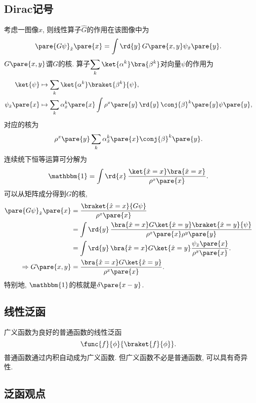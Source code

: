 \documentclass[hidelinks]{ctexart}
\begin{document}

\subsection{Dirac记号} %
\label{sub:dirac记号}

\newpoint{}考虑一图像$\hat x$, 则线性算子$\hat G$的作用在该图像中为
\[ \pare{G\psi}_{\hat x}\pare{x} = \int \rd{y}\,G\pare{x,y}\psi_{\hat x}\pare{y}. \]
\newpoint{}$G\pare{x,y}$谓$G$的核.
\newpoint{}算子$\displaystyle \sum_k \ket{\alpha^k}\bra{\beta^k}$对向量$\psi$的作用为
\begin{align*}
    \ket{\psi} &\mapsto \sum_k \ket{\alpha^k}\braket{\beta^k}{\psi}, \\
    \psi_{\hat x}\pare{x} &\mapsto \sum_k \alpha_{\hat x}^k\pare{x} \int \rho^{x}\pare{y}\,\rd{y}\, \conj{\beta}^k\pare{y}\psi\pare{y},
\end{align*}
对应的核为
\[ \rho^x\pare{y}\sum_k \alpha_{\hat x}^k\pare{x} \conj{\beta}^k\pare{y}. \]
\newpoint{}连续统下恒等运算可分解为
\[ \mathbbm{1} = \int \rd{x}\, \frac{\ket{\hat x = x}\bra{\hat x = x}}{\rho^{x}\pare{x}}. \]
\newpoint{}可以从矩阵成分得到$G$的核,
\begin{align*}
    \pare{G\psi}_{\hat x}\pare{x} &= \frac{\braket{\hat x=x}{G\psi}}{\rho^{x}\pare{x}} \\
    &= \int \rd{y}\, \frac{\bra{\hat x=x}G\ket{\hat x=y}\braket{\hat x=y}{\psi}}{\rho^x\pare{x}\rho^y\pare{y}} \\
    &= \int \rd{y}\, \bra{\hat x=x}G\ket{\hat x=y} \frac{\psi_{\hat x}\pare{x}}{\rho^{x}\pare{x}}. \\
    \Rightarrow G\pare{x,y} &= \frac{\bra{\hat x=x}G\ket{\hat x=y}}{\rho^{x}\pare{x}}.
\end{align*}
特别地, $\mathbbm{1}$的核就是$\delta\pare{x-y}$.


\subsection{线性泛函} %
\label{sub:线性泛函}

\newpoint{}广义函数为良好的普通函数的线性泛函
\[ \func{f}{\phi}{\braket{f}{\phi}}. \]
\newpoint{}普通函数通过内积自动成为广义函数.
\newpoint{}但广义函数不必是普通函数, 可以具有奇异性.


\subsection{泛函观点} %
\label{sub:泛函观点}
\end{document}
